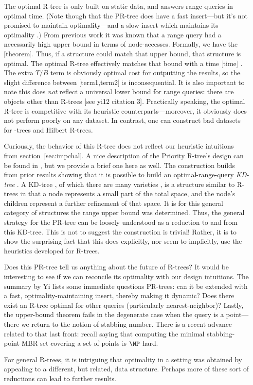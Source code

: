 The optimal R-tree is only built on static data, and answers range queries in optimal time.
(Note though that the PR-tree does have a fast insert---but it's not promised to maintain optimality---and a slow insert which maintains its optimality \cite{argeberghaverkortyi04}.)
From previous work \cite{kanthsingh99} it was known that a range query had a necessarily high upper bound in terms of node-accesses.
Formally, we have the [theorem].
Thus, if a structure could match that upper bound, that structure is optimal.
The optimal R-tree effectively matches that bound with a time [time] \cite{yi12}.
The extra $T/B$ term is obviously optimal cost for outputting the results, so the slight difference between [term1,term2] is inconsequential.
It is also important to note this does \emph{not} reflect a universal lower bound for range queries: there are objects other than R-trees [see yi12 citation 3].
Practically speaking, the optimal R-tree is competitive with its heuristic counterparts---moreover, it obviously does not perform poorly on any dataset.
In contrast, one can construct bad datasets for \rstar-trees and Hilbert R-trees.

Curiously, the behavior of this R-tree does not reflect our heuristic intuitions from section~\ref{sec:impchal}.
A nice description of the Priority R-tree's design can be found in \cite{thebook}, but we provide a brief one here as well.
The construction builds from prior results showing that it is possible to build an optimal-range-query \emph{KD-tree} \cite{agarwalberggudmundssonhammarhaverkort01}.
A KD-tree \cite{bentley75}, of which there are many varieties \cite{gaedegunther98}, is a structure similar to R-trees in that a node represents a small part of the total space, and the node's children represent a further refinement of that space.
It is for this general category of structures the range upper bound was determined.
Thus, the general strategy for the PR-tree can be loosely understood as a reduction to and from this KD-tree.
This is not to suggest the construction is trivial! Rather, it is to show the surprising fact that this does explicitly, nor seem to implicitly, use the heuristics developed for R-trees.

Does this PR-tree tell us anything about the future of R-trees?
It would be interesting to see if we can reconcile its optimality with our design intuitions.
The summary by Yi \cite{yi12} lists some immediate questions PR-trees: can it be extended with a fast, optimality-maintaining insert, thereby making it dynamic?
Does there exist an R-tree optimal for other queries (particularly nearest-neighbor)?
Lastly, the upper-bound theorem fails in the degenerate case when the query is a point---there we return to the notion of stabbing number.
There is a recent advance related to that last front: recall \cite{bergkhosraviverdonschotweele11} saying that computing the minimal stabbing-point MBR set covering a set of points is $\NP$-hard.

For general R-trees, it is intriguing that optimality in a setting was obtained by appealing to a different, but related, data structure.
Perhaps more of these sort of reductions can lead to further results.

